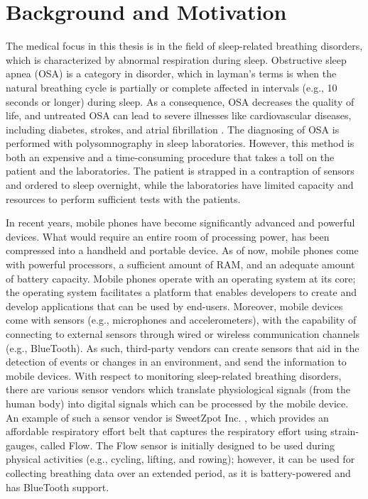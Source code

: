 \section{Background and Motivation}

The medical focus in this thesis is in the field of sleep-related breathing disorders, which is characterized by abnormal respiration during sleep. Obstructive sleep apnea (OSA) is a category in disorder, which in layman's terms is when the natural breathing cycle is partially or complete affected in intervals (e.g., 10 seconds or longer) during sleep. As a consequence, OSA decreases the quality of life, and untreated OSA can lead to severe illnesses like cardiovascular diseases, including diabetes, strokes, and atrial fibrillation \cite{sleep_disorder}. The diagnosing of OSA is performed with polysomnography in sleep laboratories. However, this method is both an expensive and a time-consuming procedure that takes a toll on the patient and the laboratories. The patient is strapped in a contraption of sensors and ordered to sleep overnight, while the laboratories have limited capacity and resources to perform sufficient tests with the patients.

In recent years, mobile phones have become significantly advanced and powerful devices. What would require an entire room of processing power, has been compressed into a handheld and portable device. As of now, mobile phones come with powerful processors, a sufficient amount of RAM, and an adequate amount of battery capacity. Mobile phones operate with an operating system at its core; the operating system facilitates a platform that enables developers to create and develop applications that can be used by end-users. Moreover, mobile devices come with sensors (e.g., microphones and accelerometers), with the capability of connecting to external sensors through wired or wireless communication channels (e.g., BlueTooth). As such, third-party vendors can create sensors that aid in the detection of events or changes in an environment, and send the information to mobile devices. With respect to monitoring sleep-related breathing disorders, there are various sensor vendors which translate physiological signals (from the human body) into digital signals which can be processed by the mobile device. An example of such a sensor vendor is SweetZpot Inc. \cite{flow}, which provides an affordable respiratory effort belt that captures the respiratory effort using strain-gauges, called Flow. The Flow sensor is initially designed to be used during physical activities (e.g., cycling, lifting, and rowing); however, it can be used for collecting breathing data over an extended period, as it is battery-powered and has BlueTooth support. 


